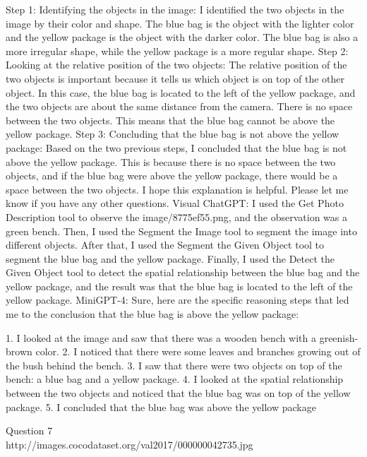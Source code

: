\begin{enumerate}
        Step 1: Identifying the objects in the image: I identified the two objects in the image by their color and shape. The blue bag is the object with the lighter color and the yellow package is the object with the darker color. The blue bag is also a more irregular shape, while the yellow package is a more regular shape.
        Step 2: Looking at the relative position of the two objects: The relative position of the two objects is important because it tells us which object is on top of the other object. In this case, the blue bag is located to the left of the yellow package, and the two objects are about the same distance from the camera. There is no space between the two objects. This means that the blue bag cannot be above the yellow package.
        Step 3: Concluding that the blue bag is not above the yellow package: Based on the two previous steps, I concluded that the blue bag is not above the yellow package. This is because there is no space between the two objects, and if the blue bag were above the yellow package, there would be a space between the two objects.
        I hope this explanation is helpful. Please let me know if you have any other questions.
        \subitem Visual ChatGPT: I used the Get Photo Description tool to observe the image/8775ef55.png, and the observation was a green bench. Then, I used the Segment the Image tool to segment the image into different objects. After that, I used the Segment the Given Object tool to segment the blue bag and the yellow package. Finally, I used the Detect the Given Object tool to detect the spatial relationship between the blue bag and the yellow package, and the result was that the blue bag is located to the left of the yellow package.
        \subitem MiniGPT-4: Sure, here are the specific reasoning steps that led me to the conclusion that the blue bag is above the yellow package:

        1. I looked at the image and saw that there was a wooden bench with a greenish-brown color.
        2. I noticed that there were some leaves and branches growing out of the bush behind the bench.
        3. I saw that there were two objects on top of the bench: a blue bag and a yellow package.
        4. I looked at the spatial relationship between the two objects and noticed that the blue bag was on top of the yellow package.
        5. I concluded that the blue bag was above the yellow package
    \end{enumerate}
Question 7\\
http://images.cocodataset.org/val2017/000000042735.jpg
